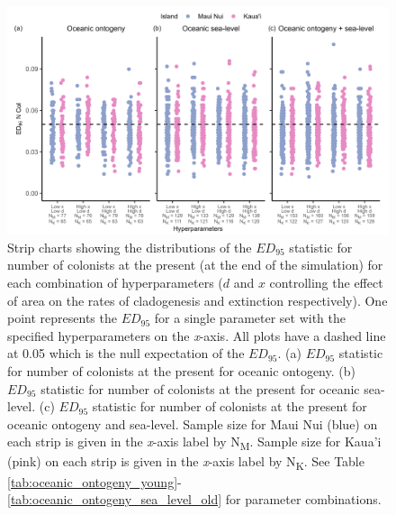 \begin{figure}
    \centering
    \includegraphics[width=\textwidth]{JBI-21-0508_FigS10.png}
    \caption{Strip charts showing the distributions of the $ED_{95}$ statistic for number of colonists at the present (at the end of the simulation) for each combination of hyperparameters ($d$ and $x$ controlling the effect of area on the rates of cladogenesis and extinction respectively). One point represents the $ED_{95}$ for a single parameter set with the specified hyperparameters on the \textit{x}-axis. All plots have a dashed line at 0.05 which is the null expectation of the $ED_{95}$. (a) $ED_{95}$ statistic for number of colonists at the present for oceanic ontogeny. (b) $ED_{95}$ statistic for number of colonists at the present for oceanic sea-level. (c) $ED_{95}$ statistic for number of colonists at the present for oceanic ontogeny and sea-level. Sample size for Maui Nui (blue) on each strip is given in the \textit{x}-axis label by N\textsubscript{M}. Sample size for Kaua'i (pink) on each strip is given in the \textit{x}-axis label by N\textsubscript{K}. See Table \ref{tab:oceanic_ontogeny_young}-\ref{tab:oceanic_ontogeny_sea_level_old} for parameter combinations.}
    \label{fig:Hyperparameters_num_col}
\end{figure}

